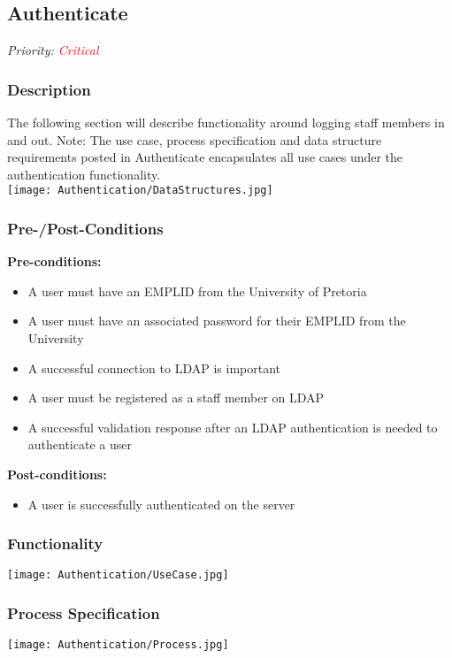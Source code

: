 


\subsection{Authenticate}
\textit{Priority: \textcolor{red}{Critical}} \\

\subsubsection{Description}
The following section will describe functionality around logging staff members in and out. Note: The use case, process specification and data structure requirements posted in Authenticate encapsulates all use cases under the authentication functionality. \\
\texttt{[image: Authentication/DataStructures.jpg]}


\subsubsection{Pre-/Post-Conditions}
	\textbf{Pre-conditions:} 
	\begin{itemize}
		\item A user must have an EMPLID from the University of Pretoria 
		\item A user must have an associated password for their EMPLID from the University
		\item A successful connection to LDAP is important
		\item A user must be registered as a staff member on LDAP
		\item A successful validation response after an LDAP authentication is needed to authenticate a user
	\end{itemize}
	\textbf{Post-conditions:} 
		\begin{itemize}
			\item A user is successfully authenticated on the server
		\end{itemize}

\subsubsection{Functionality}
	\texttt{[image: Authentication/UseCase.jpg]}	
	
\subsubsection{Process Specification}
	\texttt{[image: Authentication/Process.jpg]}

